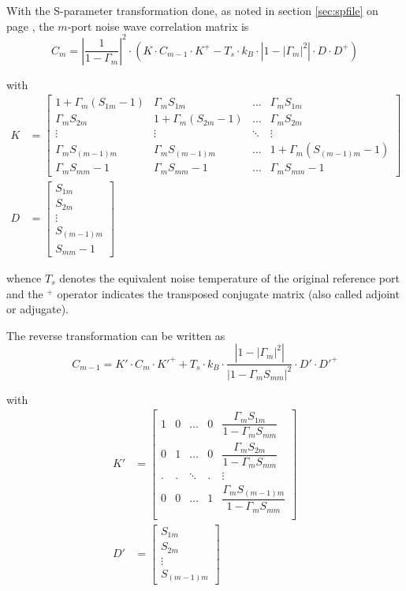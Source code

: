 With the S-parameter transformation done, as noted in section
\ref{sec:spfile} on page \pageref{sec:spfile}, the $m$-port noise wave
correlation matrix is
\begin{equation}
C_m = \left|\dfrac{1}{1 - \Gamma_m}\right|^2 \cdot \left(K\cdot C_{m-1}\cdot K^+ -T_s\cdot k_B \cdot\left|1 - \left|\Gamma_m\right|^2\right|\cdot D\cdot D^+\right)
\end{equation}

with
\begin{align}
K &=
\begin{bmatrix}
1 + \Gamma_m\left(S_{1m} -1\right) & \Gamma_m S_{1m} & \ldots & \Gamma_m S_{1m}\\
\Gamma_m S_{2m} & 1 + \Gamma_m\left(S_{2m} -1\right) & \ldots & \Gamma_m S_{2m}\\
\vdots & \vdots & \ddots & \vdots\\
\Gamma_m S_{(m-1)m} & \Gamma_m S_{(m-1)m} & \ldots & 1 + \Gamma_m\left(S_{(m-1)m} -1\right)\\
\Gamma_m S_{mm} - 1 & \Gamma_m S_{mm} - 1 & \ldots & \Gamma_m S_{mm} - 1
\end{bmatrix}\\
D &=
\begin{bmatrix}
S_{1m}\\
S_{2m}\\
\vdots\\
S_{(m-1)m}\\
S_{mm} - 1
\end{bmatrix}
\end{align}

whence $T_s$ denotes the equivalent noise temperature of the original
reference port and the $ ^{+}$ operator indicates the transposed
conjugate matrix (also called adjoint or adjugate).

\addvspace{12pt}

The reverse transformation can be written as
\begin{equation}
C_{m-1} = K'\cdot C_m\cdot K'^+ +T_s\cdot k_B \cdot\dfrac{\left|1 - \left|\Gamma_m\right|^2\right|}{\left|1 - \Gamma_m S_{mm}\right|^2}\cdot D'\cdot D'^+
\end{equation}

with
\begin{align}
K' &=
\begin{bmatrix}
1 & 0 & \ldots & 0 & \dfrac{\Gamma_m S_{1m}}{1 - \Gamma_m S_{mm}}\\
0 & 1 & \ldots & 0 & \dfrac{\Gamma_m S_{2m}}{1 - \Gamma_m S_{mm}}\\
. & . & \ddots & . & \vdots\\
0 & 0 & \ldots & 1 & \dfrac{\Gamma_m S_{(m-1)m}}{1 - \Gamma_m S_{mm}}\\
\end{bmatrix}\\
D' &=
\begin{bmatrix}
S_{1m}\\
S_{2m}\\
\vdots\\
S_{(m-1)m}
\end{bmatrix}
\end{align}

